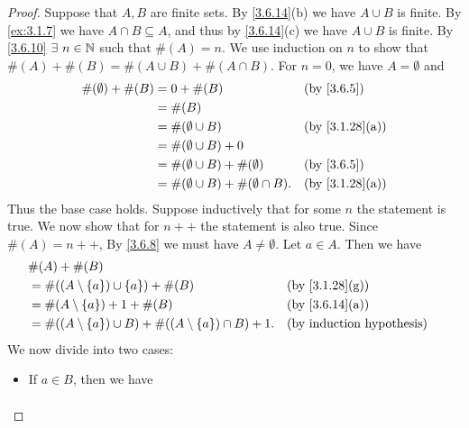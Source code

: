 \begin{proof}
  Suppose that \(A, B\) are finite sets.
  By \cref{3.6.14}(b) we have \(A \cup B\) is finite.
  By \cref{ex:3.1.7} we have \(A \cap B \subseteq A\), and thus by \cref{3.6.14}(c) we have \(A \cup B\) is finite.
  By \cref{3.6.10} \(\exists\ n \in \N\) such that \(\#(A) = n\).
  We use induction on \(n\) to show that \(\#(A) + \#(B) = \#(A \cup B) + \#(A \cap B)\).
  For \(n = 0\), we have \(A = \emptyset\) and
  \begin{align*}
    \#(\emptyset) + \#(B) & = 0 + \#(B)                                    &  & \by{3.6.5}                   \\
                          & = \#(B)                                                                          \\
                          & = \#(\emptyset \cup B)                         &  & \text{(by \cref{3.1.28}(a))} \\
                          & = \#(\emptyset \cup B) + 0                                                       \\
                          & = \#(\emptyset \cup B) + \#(\emptyset)         &  & \by{3.6.5}                   \\
                          & = \#(\emptyset \cup B) + \#(\emptyset \cap B). &  & \text{(by \cref{3.1.28}(a))}
  \end{align*}
  Thus the base case holds.
  Suppose inductively that for some \(n\) the statement is true.
  We now show that for \(n++\) the statement is also true.
  Since \(\#(A) = n++\), By \cref{3.6.8} we must have \(A \neq \emptyset\).
  Let \(a \in A\).
  Then we have
  \begin{align*}
     & \#(A) + \#(B)                                                                                            \\
     & = \#((A \setminus \{a\}) \cup \{a\}) + \#(B)                           &  & \text{(by \cref{3.1.28}(g))} \\
     & = \#(A \setminus \{a\}) + 1 + \#(B)                                    &  & \text{(by \cref{3.6.14}(a))} \\
     & = \#((A \setminus \{a\}) \cup B) + \#((A \setminus \{a\}) \cap B) + 1. &  & \byIH
  \end{align*}
  We now divide into two cases:
  \begin{itemize}
    \item If \(a \in B\), then we have
          \begin{align*}

\end{align*}
\end{itemize}
\end{proof}
